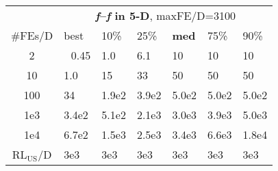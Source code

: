 \begin{tabular}{c|llllll}
 & \multicolumn{6}{|c}{\textbf{\textit{f}\raisebox{-0.35ex}{1}--\textit{f}\raisebox{-0.35ex}{24} in 5-D}, maxFE/D=3100}\\
\#FEs/D & best & 10\% & 25\% & \textbf{med} & 75\% & 90\%\\
2 & ~\,0.45 & \hspace*{1ex}1.0 & \hspace*{1ex}6.1 & 10 & 10 & 10\\
10 & \hspace*{1ex}1.0 & 15 & 33 & 50 & 50 & 50\\
100 & 34 & 1.9e2 & 3.9e2 & 5.0e2 & 5.0e2 & 5.0e2\\
1e3 & 3.4e2 & 5.1e2 & 2.1e3 & 3.0e3 & 3.9e3 & 5.0e3\\
1e4 & 6.7e2 & 1.5e3 & 2.5e3 & 3.4e3 & 6.6e3 & 1.8e4\\
$\text{RL}_{\text{US}}$/D & 3e3 & 3e3 & 3e3 & 3e3 & 3e3 & 3e3
\end{tabular}

